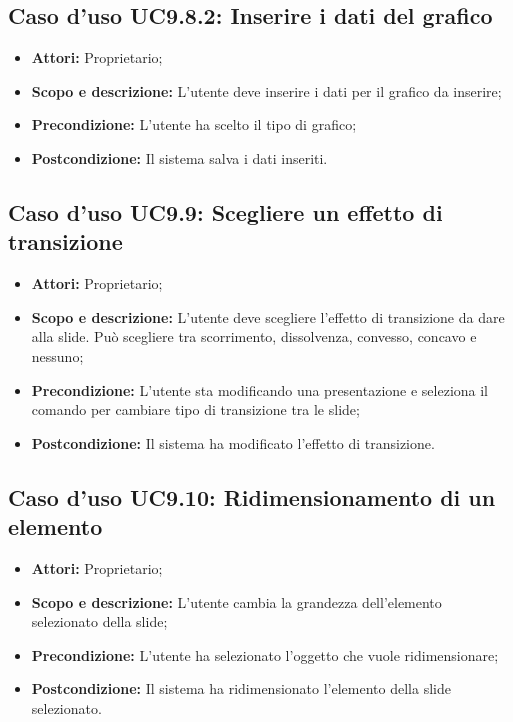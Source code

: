 	\subsection{Caso d'uso UC9.8.2: Inserire i dati del grafico}
	\begin{itemize}
		\item \textbf{Attori:} Proprietario;
		\item \textbf{Scopo e descrizione:} L'utente deve inserire i dati per il grafico da inserire;
		\item \textbf{Precondizione:} L'utente ha scelto il tipo di grafico;
		\item \textbf{Postcondizione:} Il sistema salva i dati inseriti.
	\end{itemize}


\subsection{Caso d'uso UC9.9: Scegliere un effetto di transizione}
\begin{itemize}
	\item \textbf{Attori:} Proprietario;
	\item \textbf{Scopo e descrizione:} L'utente deve scegliere l'effetto di transizione da dare alla \gls{slide}. Può scegliere tra scorrimento, dissolvenza, convesso, concavo e nessuno;
	\item \textbf{Precondizione:} L'utente sta modificando una presentazione e seleziona il comando per cambiare tipo di transizione tra le \gls{slide};
	\item \textbf{Postcondizione:} Il sistema ha modificato l'effetto di transizione.
\end{itemize}


\subsection{Caso d'uso UC9.10: Ridimensionamento di un elemento}
\begin{itemize}
	\item \textbf{Attori:} Proprietario;
	\item \textbf{Scopo e descrizione:} L'utente cambia la grandezza dell'elemento selezionato della \gls{slide};
	\item \textbf{Precondizione:} L'utente ha selezionato l'oggetto che vuole ridimensionare;
	\item \textbf{Postcondizione:} Il sistema ha ridimensionato l'elemento della \gls{slide} selezionato.
\end{itemize}



